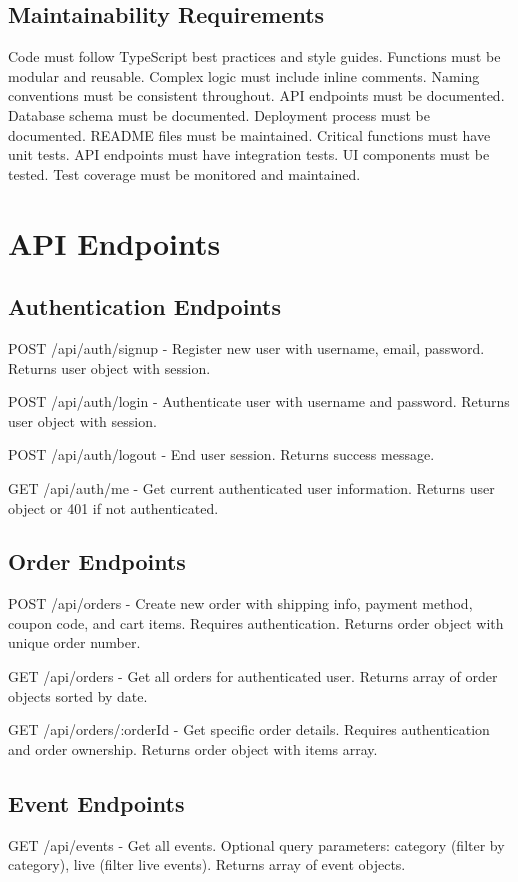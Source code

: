 ﻿\documentclass[11pt]{article}
\begin{document}
\subsection{Maintainability Requirements}
Code must follow TypeScript best practices and style guides. Functions must be modular and reusable. Complex logic must include inline comments. Naming conventions must be consistent throughout. API endpoints must be documented. Database schema must be documented. Deployment process must be documented. README files must be maintained. Critical functions must have unit tests. API endpoints must have integration tests. UI components must be tested. Test coverage must be monitored and maintained.

\section{API Endpoints}

\subsection{Authentication Endpoints}
POST /api/auth/signup - Register new user with username, email, password. Returns user object with session.

POST /api/auth/login - Authenticate user with username and password. Returns user object with session.

POST /api/auth/logout - End user session. Returns success message.

GET /api/auth/me - Get current authenticated user information. Returns user object or 401 if not authenticated.

\subsection{Order Endpoints}
POST /api/orders - Create new order with shipping info, payment method, coupon code, and cart items. Requires authentication. Returns order object with unique order number.

GET /api/orders - Get all orders for authenticated user. Returns array of order objects sorted by date.

GET /api/orders/:orderId - Get specific order details. Requires authentication and order ownership. Returns order object with items array.

\subsection{Event Endpoints}
GET /api/events - Get all events. Optional query parameters: category (filter by category), live (filter live events). Returns array of event objects.
\end{document}
